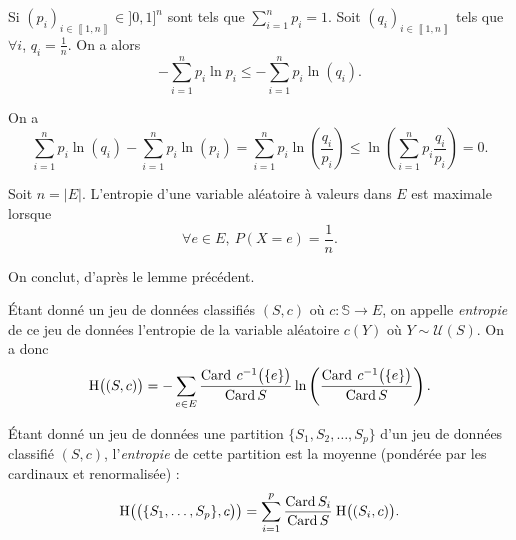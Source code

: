 \begin{lem}
	Si $(p_i)_{i\in\left\llbracket 1,n \right\rrbracket} \in {]0,1]}^n$ sont tels que $\sum_{i=1}^n p_i = 1$. Soit $(q_i)_{i\in\left\llbracket 1,n \right\rrbracket}$\/ tels que $\forall i$, $q_i = \frac{1}{n}$. On a alors \[
		- \sum_{i=1}^n p_i \ln p_i \le - \sum_{i=1}^n p_i \ln(q_i)
	.\]
\end{lem}

\begin{prv}
	On a \[
		\sum_{i=1}^n p_i \ln(q_i) - \sum_{i=1}^n p_i \ln(p_i) =
		\sum_{i=1}^n p_i \ln\left( \frac{q_i}{p_i} \right) \le \ln\left( \sum_{i=1}^n p_i \frac{q_i}{p_i} \right) = 0
	.\]
\end{prv}

\begin{prop}
	Soit $n= |E|$. L'entropie d'une variable aléatoire à valeurs dans $E$\/ est maximale lorsque \[
		\forall e \in E,\:P(X = e) = \frac{1}{n}
	.\]
\end{prop}

\begin{prv}
	On conclut, d'après le lemme précédent.
\end{prv}

\begin{defn}
	Étant donné un jeu de données classifiés $(S, c)$ où $c : \mathds{S} \to E$, on appelle \textit{entropie} de ce jeu de données l'entropie de la variable aléatoire $c(Y)$\/ où $Y \sim \mathcal{U}(S)$.
	On a donc \[
		\mathrm{H}\big((S,c)\big) = -\sum_{e \in E} \frac{\operatorname{Card}\:c^{-1}\big(\{e\}\big)}{\operatorname{Card} S} \ln\left( \frac{\operatorname{Card}\:c^{-1}\big(\{e\}\big)}{\operatorname{Card} S} \right) 
	.\]
\end{defn}

\begin{defn}
	Étant donné un jeu de données une partition $\{S_1, S_2, \ldots, S_p\}$\/ d'un jeu de données classifié $(S, c)$, l'\textit{entropie} de cette partition est la moyenne (pondérée par les cardinaux et renormalisée) : \[
		\mathrm{H}\big(\big(\{S_1,\ldots,S_p\}, c\big)\big) = \sum_{i=1}^p \frac{\operatorname{Card} S_i}{\operatorname{Card} S}\:\mathrm{H}\big((S_i,c)\big)
	.\]
\end{defn}

